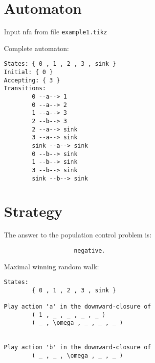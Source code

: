 \documentclass{article}
\begin{document}
%
\section*{Automaton}

Input nfa from file {\tt example1.tikz}
\begin{center}
 
\end{center}

Complete automaton:
\begin{verbatim}
States: { 0 , 1 , 2 , 3 , sink }
Initial: { 0 }
Accepting: { 3 }
Transitions:
        0 --a--> 1
        0 --a--> 2
        1 --a--> 3
        2 --b--> 3
        2 --a--> sink
        3 --a--> sink
        sink --a--> sink
        0 --b--> sink
        1 --b--> sink
        3 --b--> sink
        sink --b--> sink
\end{verbatim}

\newpage

\section*{Strategy}

The answer to the population control problem is:
\begin{verbatim}
					negative.
\end{verbatim}


\noindent Maximal winning random walk:
\begin{verbatim}
States:
		{ 0 , 1 , 2 , 3 , sink }

Play action 'a' in the downward-closure of
		( 1 , _ , _ , _ , _ )
		( _ , \omega , _ , _ , _ )


Play action 'b' in the downward-closure of
		( _ , _ , \omega , _ , _ )
\end{verbatim}
\end{document}
